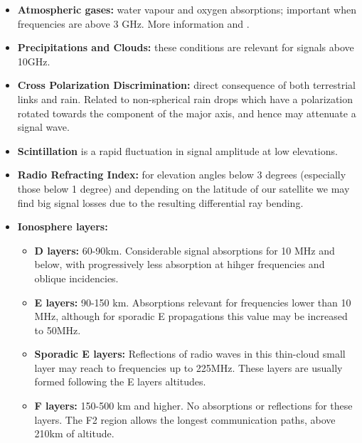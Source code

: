 \begin{itemize}



\item\textbf{ Atmospheric gases: }water vapour and oxygen absorptions; important when frequencies are above 3 GHz. More information \cite{Zubair2011} and \cite{Luini2015}.\\

\item\textbf{ Precipitations and Clouds: }these conditions are relevant for signals above 10GHz. \\

\item\textbf{ Cross Polarization Discrimination: }direct consequence of both terrestrial links and rain. Related to non-spherical rain drops which have a polarization rotated towards the component of the major axis, and hence may attenuate a signal wave. \\

\item\textbf{ Scintillation } is a rapid fluctuation in signal amplitude at low elevations. \\

\item\textbf{ Radio Refracting Index: } for elevation angles below 3 degrees (especially those below 1 degree) and depending on the latitude of our satellite we may find big signal losses due to the resulting differential ray bending.\\


\item\textbf{ Ionosphere layers: }


\begin{itemize}

\item\textbf{D layers:} 60-90km. Considerable signal absorptions for 10 MHz and below, with progressively less absorption at hihger frequencies and oblique incidencies.\\

\item\textbf{E layers:} 90-150 km. Absorptions relevant for frequencies lower than 10 MHz, although for sporadic E propagations this value may be increased to 50MHz.  \\

\item\textbf{Sporadic E layers:} Reflections of radio waves in this thin-cloud small layer may reach to frequencies up to 225MHz. These layers are usually formed following the E layers altitudes. \\

\item\textbf{F layers:} 150-500 km and higher. No absorptions or reflections for these layers. The F2 region allows the longest communication paths, above 210km of altitude. \\

\end{itemize}
\end{itemize}
